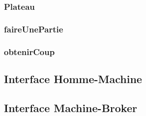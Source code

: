\documentclass{article}
\begin{document}
\subsubsection{Plateau}


\subsubsection{faireUnePartie}


\subsubsection{obtenirCoup}


\subsection{Interface Homme-Machine}                                                                                                                                                                      
                                                                                                                                               
                                                                                                                                                                                                         
\subsection{Interface Machine-Broker}                                                                                                                                                                    
                                                                                                                                                
                                                            
\end{document}
